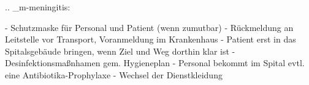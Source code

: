 
.. _m-meningitis:


\begin{itemize}
  -   Schutzmaske für Personal und Patient (wenn zumutbar)
  -   Rückmeldung an Leitstelle vor Transport, Voranmeldung im Krankenhaus
  -   Patient erst in das Spitalsgebäude bringen, wenn
  Ziel und Weg dorthin klar ist
  -   Desinfektionsmaßnhamen gem. Hygieneplan
  -   Personal bekommt im Spital evtl. eine Antibiotika-Prophylaxe
  -   Wechsel der Dienstkleidung
\end{itemize}